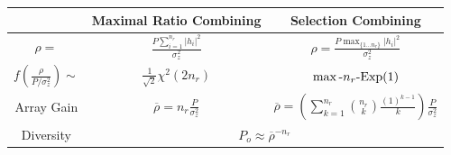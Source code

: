 \documentclass[xcolor=dvipsnames,aspectratio=169]{beamer}
\begin{document}
{\begin{columns}
\begin{column}{6cm}
 \end{column}
\end{columns}
\begin{table}
  \begin{tabular}{c|c|c}
   &Maximal Ratio Combining& Selection Combining\\\hline
   $\rho=$&$\frac{P\sum_{i=1}^{n_r}|h_i|^2}{\sigma_z^2}$& $\rho=\frac{ P\max_{\{1\dots n_r\}} |h_i|^2}{\sigma_z^2}$\\
   $f(\frac{\rho}{P/\sigma_z^2})\sim$&$\frac{1}{\sqrt{2}}\chi^2(2n_r)$& $\max\textnormal{-}n_r\textnormal{-}\textnormal{Exp}(1)$\\
   Array Gain&$\overline{\rho}=n_r\frac{P}{\sigma_z^2}$& $\overline{\rho}=\left(\sum_{k=1}^{n_r}{n_r \choose k}\frac{(1)^{k-1}}{k}\right)\frac{P}{\sigma_z^2}$\\\hline
   Diversity& \multicolumn{2}{c}{$P_o\approx\overline{\rho}^{-n_r}$}
  \end{tabular}
\end{table}
}
\end{document}
